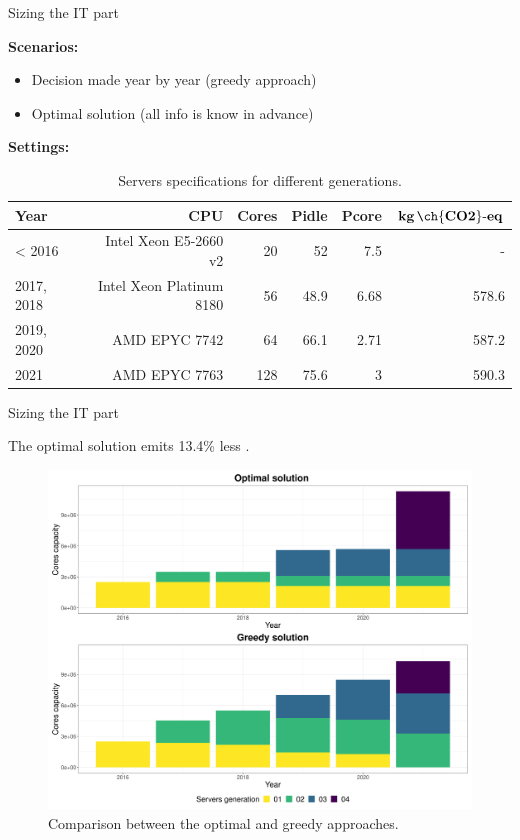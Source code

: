 \documentclass[Ligatures=TeX,table,svgnames,usetotalslideindicator,compress,10pt]{beamer}
\begin{document}
\begin{frame}{Sizing the IT part}


\textbf{Scenarios:}
\begin{itemize}
 \item Decision made year by year (greedy approach)
 \item Optimal solution (all info is know in advance)
\end{itemize}

\textbf{Settings:}

\begin{table}[h]
  \small
  \caption{Servers specifications for different generations.} \centering
  \label{tab:servers_specs} 
  \begin{tabular}{|l|r|r|r|r|r|}
  \hline    
  \textbf{Year} & \textbf{CPU} &   \textbf{Cores} & \textbf{Pidle}  & \textbf{Pcore}  & \textbf{$\mathbf{kg\,\ch{CO2}\text{-}eq}$}  \\
  \hline
  < 2016      & Intel Xeon E5-2660 v2 & 20 & 52 & 7.5  & -   \\
  \hline
  2017, 2018 & Intel Xeon Platinum 8180 & 56 & 48.9 & 6.68  & 578.6   \\
  \hline
  2019, 2020   & AMD EPYC 7742  & 64 & 66.1 & 2.71  & 587.2 \\
  \hline
  2021        & AMD EPYC 7763 & 128 & 75.6 & 3     & 590.3 \\
  \hline
\end{tabular}  
\end{table}

\end{frame}

\begin{frame}{Sizing the IT part}

  The optimal solution emits 13.4\% less .

  \begin{center}
    \begin{figure}[h]
      \centering
      \includegraphics[width=.77\textwidth]{images/cloud_federation_evolution_lifetime.png}
      \caption{Comparison between the optimal and greedy approaches.}
    \end{figure}
  \end{center}


\end{frame}
\end{document}
